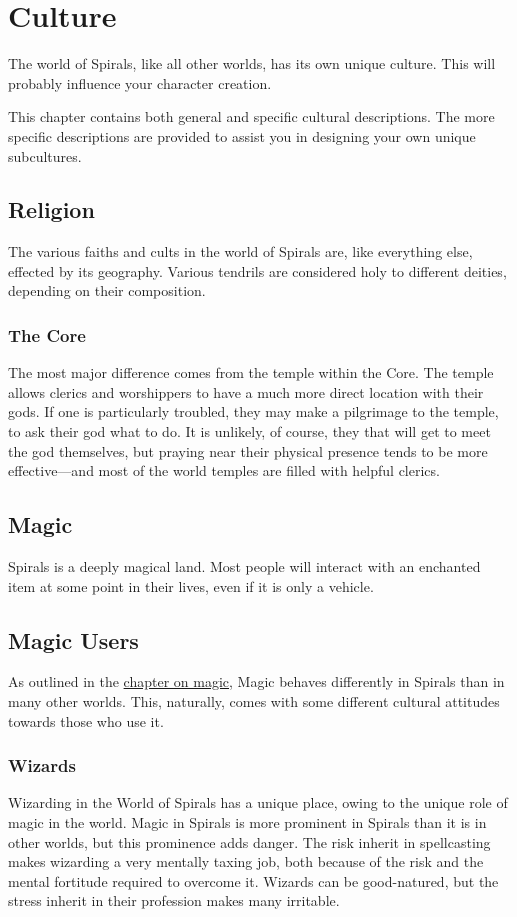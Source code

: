 \chapter{Culture}
The world of Spirals, like all other worlds, has its own unique culture.
This will probably influence your character creation.

This chapter contains both general and specific cultural descriptions.
The more specific descriptions are provided to assist you in designing your own unique subcultures.

\begin{multicols}{2}
\section{Religion}
The various faiths and cults in the world of Spirals are, like everything else, effected by its geography.
Various tendrils are considered holy to different deities, depending on their composition.

\subsection{The Core}
The most major difference comes from the temple within the Core. 
The temple allows clerics and worshippers to have a much more direct location with their gods.
If one is particularly troubled, they may make a pilgrimage to the temple, to ask their god what to do.
It is unlikely, of course, they that will get to meet the god themselves, but praying near their physical presence tends to be more effective---and most of the world temples are filled with helpful clerics.

\section{Magic}
Spirals is a deeply magical land.
Most people will interact with an enchanted item at some point in their lives, even if it is only a vehicle.


\section{Magic Users}
As outlined in the \hyperref[chapter:magic]{chapter on magic}, Magic behaves differently in Spirals than in many other worlds.
This, naturally, comes with some different cultural attitudes towards those who use it.

\subsection{Wizards}
Wizarding in the World of Spirals has a unique place, owing to the unique role of magic in the world.
Magic in Spirals is more prominent in Spirals than it is in other worlds, but this prominence adds danger.
The risk inherit in spellcasting makes wizarding a very mentally taxing job, both because of the risk and the mental fortitude required to overcome it.
Wizards can be good-natured, but the stress inherit in their profession makes many irritable. 


\end{multicols}

